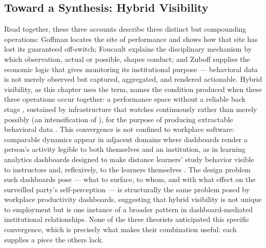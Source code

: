 \documentclass[10pt]{article}
\begin{document}
\subsection{Toward a Synthesis: Hybrid Visibility}

Read together, these three accounts describe three distinct but compounding operations: Goffman locates the site of performance and shows how that site has lost its guaranteed off-switch; Foucault explains the disciplinary mechanism by which observation, actual or possible, shapes conduct; and Zuboff supplies the economic logic that gives monitoring its institutional purpose --- behavioral data is not merely observed but captured, aggregated, and rendered actionable. Hybrid visibility, as this chapter uses the term, names the condition produced when these three operations occur together: a performance space without a reliable back stage \cite{goffman}, sustained by infrastructure that watches continuously rather than merely possibly (an intensification of \cite{foucault}), for the purpose of producing extractable behavioral data \cite{zuboff}. This convergence is not confined to workplace software: comparable dynamics appear in adjacent domains where dashboards render a person's activity legible to both themselves and an institution, as in learning analytics dashboards designed to make distance learners' study behavior visible to instructors and, reflexively, to the learners themselves \cite{rets}. The design problem such dashboards pose --- what to surface, to whom, and with what effect on the surveilled party's self-perception --- is structurally the same problem posed by workplace productivity dashboards, suggesting that hybrid visibility is not unique to employment but is one instance of a broader pattern in dashboard-mediated institutional relationships. None of the three theorists anticipated this specific convergence, which is precisely what makes their combination useful: each supplies a piece the others lack.
\end{document}
